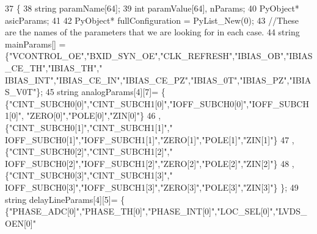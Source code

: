 \begin{DoxyCode}
37 \{
38     \textcolor{keywordtype}{string} paramName[64];
39     \textcolor{keywordtype}{int} paramValue[64], nParams;
40     PyObject* asicParams;
41 
42     PyObject* fullConfiguration = PyList\_New(0);
43     \textcolor{comment}{//These are the names of the parameters that we are looking for in each case.}
44     \textcolor{keywordtype}{string} mainParams[] = \{\textcolor{stringliteral}{"VCONTROL\_OE"},\textcolor{stringliteral}{"BXID\_SYN\_OE"},\textcolor{stringliteral}{"CLK\_REFRESH"},\textcolor{stringliteral}{"IBIAS\_OB"},\textcolor{stringliteral}{"IBIAS\_CE\_TH"},\textcolor{stringliteral}{"IBIAS\_TH"},\textcolor{stringliteral}{"
      IBIAS\_INT"},\textcolor{stringliteral}{"IBIAS\_CE\_IN"},\textcolor{stringliteral}{"IBIAS\_CE\_PZ"},\textcolor{stringliteral}{"IBIAS\_0T"},\textcolor{stringliteral}{"IBIAS\_PZ"},\textcolor{stringliteral}{"IBIAS\_V0T"}\};
45     \textcolor{keywordtype}{string} analogParams[4][7]=      \{ \{\textcolor{stringliteral}{"CINT\_SUBCH0[0]"},\textcolor{stringliteral}{"CINT\_SUBCH1[0]"},\textcolor{stringliteral}{"IOFF\_SUBCH0[0]"},\textcolor{stringliteral}{"IOFF\_SUBCH1[0]"},\textcolor{stringliteral}{
      "ZERO[0]"},\textcolor{stringliteral}{"POLE[0]"},\textcolor{stringliteral}{"ZIN[0]"}\}
46                                                                 , \{\textcolor{stringliteral}{"CINT\_SUBCH0[1]"},\textcolor{stringliteral}{"CINT\_SUBCH1[1]"},\textcolor{stringliteral}{"
      IOFF\_SUBCH0[1]"},\textcolor{stringliteral}{"IOFF\_SUBCH1[1]"},\textcolor{stringliteral}{"ZERO[1]"},\textcolor{stringliteral}{"POLE[1]"},\textcolor{stringliteral}{"ZIN[1]"}\}
47                                                                 , \{\textcolor{stringliteral}{"CINT\_SUBCH0[2]"},\textcolor{stringliteral}{"CINT\_SUBCH1[2]"},\textcolor{stringliteral}{"
      IOFF\_SUBCH0[2]"},\textcolor{stringliteral}{"IOFF\_SUBCH1[2]"},\textcolor{stringliteral}{"ZERO[2]"},\textcolor{stringliteral}{"POLE[2]"},\textcolor{stringliteral}{"ZIN[2]"}\}
48                                                                 , \{\textcolor{stringliteral}{"CINT\_SUBCH0[3]"},\textcolor{stringliteral}{"CINT\_SUBCH1[3]"},\textcolor{stringliteral}{"
      IOFF\_SUBCH0[3]"},\textcolor{stringliteral}{"IOFF\_SUBCH1[3]"},\textcolor{stringliteral}{"ZERO[3]"},\textcolor{stringliteral}{"POLE[3]"},\textcolor{stringliteral}{"ZIN[3]"}\}             \};
49     \textcolor{keywordtype}{string} delayLineParams[4][5]= \{ \{\textcolor{stringliteral}{"PHASE\_ADC[0]"},\textcolor{stringliteral}{"PHASE\_TH[0]"},\textcolor{stringliteral}{"PHASE\_INT[0]"},\textcolor{stringliteral}{"LOC\_SEL[0]"},\textcolor{stringliteral}{"LVDS\_OEN[0]"}

\end{DoxyCode}

